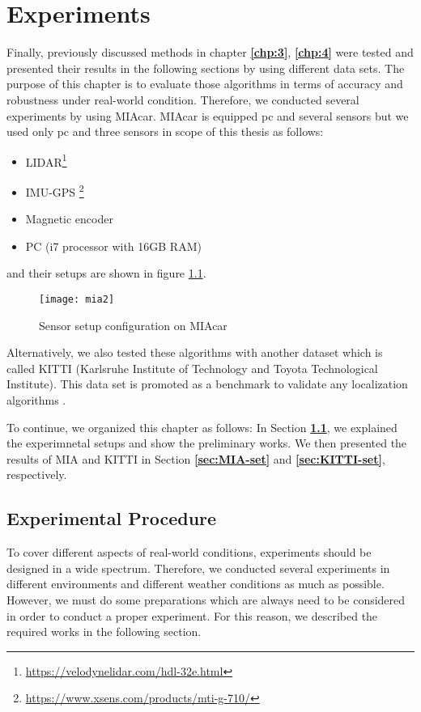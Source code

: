 \chapter{Experiments}\label{chp:5}
Finally, previously discussed methods in chapter \textbf{\ref{chp:3}}, \textbf{\ref{chp:4}} were tested and presented their results in the following sections by using different data sets. The purpose of this chapter is to evaluate those algorithms in terms of accuracy and robustness under real-world condition. Therefore, we conducted several experiments by using MIAcar. MIAcar is equipped pc and several sensors but we used only pc and three sensors in scope of this thesis as follows:
\begin{itemize}
    \item LIDAR\footnote{\url{https://velodynelidar.com/hdl-32e.html}}
    \item IMU-GPS \footnote{\url{https://www.xsens.com/products/mti-g-710/}}
    \item Magnetic encoder
    \item PC (i7 processor with 16GB RAM)
\end{itemize}
and their setups are shown in figure \ref{fig:setup}.
\\
\begin{figure}[ht]
    \centering
    \texttt{[image: mia2]}
    \caption{Sensor setup configuration on MIAcar}
    \label{fig:setup}
\end{figure}


\newpage
Alternatively, we also tested these algorithms with another dataset which is called KITTI (Karlsruhe Institute of Technology and Toyota Technological Institute). This data set is promoted as a benchmark to validate any localization algorithms \cite{kitti}.
\par To continue, we organized this chapter as follows: In Section \textbf{\ref{sec:Exp}}, we explained the experimnetal setups and show the preliminary works. We then presented the results  of MIA and KITTI in Section \textbf{\ref{sec:MIA-set}} and \textbf{\ref{sec:KITTI-set}}, respectively.

\section{Experimental Procedure}\label{sec:Exp}
To cover different aspects of real-world conditions, experiments should be designed in a wide spectrum. Therefore, we conducted several experiments in different environments and different weather conditions as much as possible. However, we must do some preparations which are always need to be considered in order to conduct a proper experiment. For this reason, we described the required works in the following section. 

